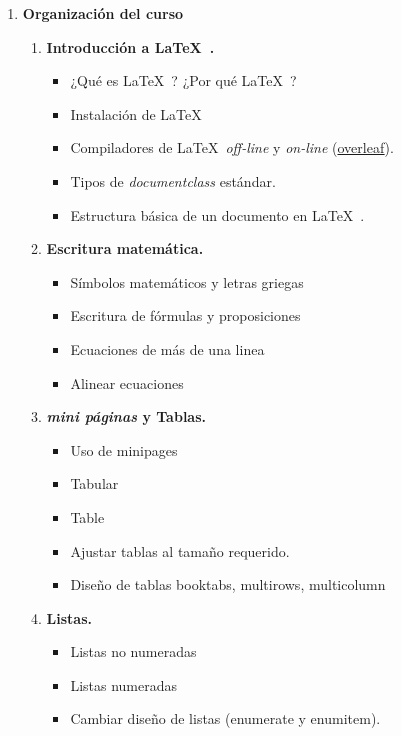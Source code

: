 \documentclass[11pt]{article}
\begin{document}
\begin{enumerate}
\item \textbf{Organización del curso}

\begin{multicols}{2}
 \setlength{\columnseprule}{0.8pt} 
\begin{enumerate}[start=1,label={\bfseries \arabic*.},leftmargin=1cm]
    \item \textbf{Introducción a \LaTeX\ . }
        \begin{itemize}
            \item ¿Qué es \LaTeX\ ? ¿Por qué \LaTeX\ ?
            \item Instalación de \LaTeX\  
            \item Compiladores de \LaTeX\  \textit{off-line} y \textit{on-line}  (\href{www.overleaf.com}{overleaf}).
            \item Tipos de \textit{documentclass} estándar.
            \item Estructura básica de un documento en \LaTeX\ .
        \end{itemize}
    \item \textbf{Escritura matemática.}
        \begin{itemize}
            \item Símbolos matemáticos y letras griegas
            \item Escritura de fórmulas y proposiciones
            \item Ecuaciones de más de una linea
            \item Alinear ecuaciones
        \end{itemize}
    \item \textbf{\textit{mini páginas} y Tablas.}
        \begin{itemize}
            \item Uso de minipages
            \item Tabular
            \item Table
            \item Ajustar tablas al tamaño requerido.
            \item Diseño de tablas booktabs, multirows, multicolumn
        \end{itemize}
    \item \textbf{Listas.} 
        \begin{itemize}
            \item Listas no numeradas
            \item Listas numeradas
            \item Cambiar diseño de listas (enumerate y enumitem).

\end{itemize}
\end{enumerate}
\end{multicols}
\end{enumerate}
\end{document}
